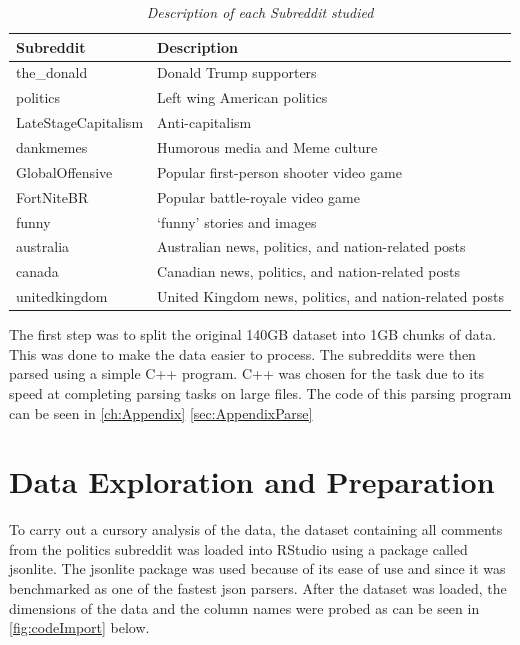 \begin{table}[H]
\centering
    \begin{tabular}{l|l}
        \bfseries Subreddit & \bfseries Description \\
        \hline
        the\_donald         & Donald Trump supporters            \\
        \hline
        politics            & Left wing American politics            \\
        \hline
        LateStageCapitalism & Anti-capitalism \\
        \hline
        dankmemes           & Humorous media and Meme culture          \\
        \hline
        GlobalOffensive     & Popular first-person shooter video game        \\
        \hline
        FortNiteBR          & Popular battle-royale video game           \\
        \hline
        funny               & ‘funny’ stories and images           \\
        \hline
        australia           & Australian news, politics, and nation-related posts            \\
        \hline
        canada              & Canadian news, politics, and nation-related posts                        \\
        \hline
        unitedkingdom       & United Kingdom news, politics, and nation-related posts \\
        \hline
    \end{tabular}
    \caption{\textit{Description of each Subreddit studied}}
    \label{tab:subredditDescriptions}
\end{table}

The first step was to split the original 140GB dataset into 1GB chunks of data. This was done to make the data easier to process. The subreddits were then parsed using a simple C++ program. C++ was chosen for the task due to its speed at completing parsing tasks on large files. The code of this parsing program can be seen in \autoref{ch:Appendix} \autoref{sec:AppendixParse}
 

\section {Data Exploration and Preparation}
\label{sec:DEP}
To carry out a cursory analysis of the data, the dataset containing all comments from the politics subreddit was loaded into RStudio using a package called jsonlite. The jsonlite package was used because of its ease of use and since it was benchmarked as one of the fastest json parsers. \cite{18} After the dataset was loaded, the dimensions of the data and the column names were probed as can be seen in \autoref{fig:codeImport} below.


